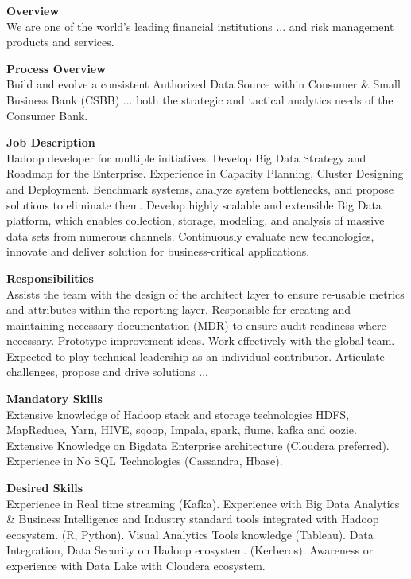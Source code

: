 \clearpage
\begin{tcolorbox}[colback=boxbackground,colframe=boxframe,sharp corners,
title=Sample Job Description,
label=box:vacancy_posting]
\noindent \textbf{Overview}\\
We are one of the world's leading financial institutions ... and risk management products and services.

\noindent \textbf{Process Overview}\\
Build and evolve a consistent Authorized Data Source within Consumer \& Small Business Bank (CSBB) ... both the strategic and tactical analytics needs of the Consumer Bank.

\noindent \textbf{Job Description}\\
Hadoop developer for multiple initiatives. Develop Big Data Strategy and Roadmap for the Enterprise. Experience in Capacity Planning, Cluster Designing and Deployment. Benchmark systems, analyze system bottlenecks, and propose solutions to eliminate them. Develop highly scalable and extensible Big Data platform, which enables collection, storage, modeling, and analysis of massive data sets from numerous channels. Continuously evaluate new technologies, innovate and deliver solution for business-critical applications.

\noindent \textbf{Responsibilities}\\
Assists the team with the design of the architect layer to ensure re-usable metrics and attributes within the reporting layer. Responsible for creating and maintaining necessary documentation (MDR) to ensure audit readiness where necessary. Prototype improvement ideas. Work effectively with the global team. Expected to play technical leadership as an individual contributor. Articulate challenges, propose and drive solutions ...

\noindent \textbf{Mandatory Skills}\\
Extensive knowledge of Hadoop stack and storage technologies HDFS, MapReduce, Yarn, HIVE, sqoop, Impala, spark, flume, kafka and oozie. Extensive Knowledge on Bigdata Enterprise architecture (Cloudera preferred). Experience in No SQL Technologies (Cassandra, Hbase).

\noindent \textbf{Desired Skills}\\
Experience in Real time streaming (Kafka). Experience with Big Data Analytics \& Business Intelligence and Industry standard tools integrated with Hadoop ecosystem. (R, Python). Visual Analytics Tools knowledge (Tableau). Data Integration, Data Security on Hadoop ecosystem. (Kerberos). Awareness or experience with Data Lake with Cloudera ecosystem.

\end{tcolorbox}


